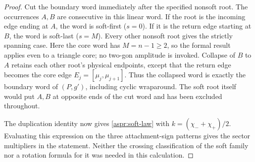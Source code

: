 \begin{proof}
Cut the boundary word immediately after the specified nonsoft root.
The occurrences $A,B$ are consecutive in this linear word. If the root
is the incoming edge ending at $A$, the word is soft-first ($s=0$).
If it is the return edge starting at $B$, the word is soft-last
($s=M$). Every other nonsoft root gives the strictly spanning case.
Here the core word has $M=n-1\geq2$, so the formal result applies even
to a triangle core; no two-gon amplitude is invoked. Collapse of $B$
to $A$ retains each other root's physical endpoints, except that the
return edge becomes the core edge $E_j=[\mu_j,\mu_{j+1}]$. Thus the
collapsed word is exactly the boundary word of $(P,g')$, including
cyclic wraparound. The soft root itself would put $A,B$ at opposite
ends of the cut word and has been excluded throughout.

The duplication identity now gives \eqref{aspr:soft-law} with
$k=(\chi_-+\chi_+)/2$. Evaluating this expression on the three
attachment-sign patterns gives the sector multipliers in the
statement. Neither the crossing classification of the soft family
nor a rotation formula for it was needed in this calculation.
\end{proof}

